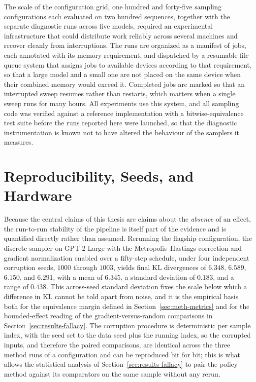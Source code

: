 The scale of the configuration grid, one hundred and forty-five sampling configurations each evaluated on two hundred sequences, together with the separate diagnostic runs across five models, required an experimental infrastructure that could distribute work reliably across several machines and recover cleanly from interruptions. The runs are organized as a manifest of jobs, each annotated with its memory requirement, and dispatched by a resumable file-queue system that assigns jobs to available devices according to that requirement, so that a large model and a small one are not placed on the same device when their combined memory would exceed it. Completed jobs are marked so that an interrupted sweep resumes rather than restarts, which matters when a single sweep runs for many hours. All experiments use this system, and all sampling code was verified against a reference implementation with a bitwise-equivalence test suite before the runs reported here were launched, so that the diagnostic instrumentation is known not to have altered the behaviour of the samplers it measures.

\section{Reproducibility, Seeds, and Hardware}
\label{sec:meth-repro}

Because the central claims of this thesis are claims about the \emph{absence} of an effect, the run-to-run stability of the pipeline is itself part of the evidence and is quantified directly rather than assumed. Rerunning the flagship configuration, the discrete sampler on GPT-2 Large with the Metropolis--Hastings correction and gradient normalization enabled over a fifty-step schedule, under four independent corruption seeds, $1000$ through $1003$, yields final KL divergences of $6.348$, $6.589$, $6.150$, and $6.291$, with a mean of $6.345$, a standard deviation of $0.183$, and a range of $0.438$.
This across-seed standard deviation fixes the scale below which a difference in KL cannot be told apart from noise, and it is the empirical basis both for the equivalence margin defined in Section~\ref{sec:meth-metrics} and for the bounded-effect reading of the gradient-versus-random comparisons in Section~\ref{sec:results-fallacy}. The corruption procedure is deterministic per sample index, with the seed set to the data seed plus the running index, so the corrupted inputs, and therefore the paired comparisons, are identical across the three method runs of a configuration and can be reproduced bit for bit; this is what allows the statistical analysis of Section~\ref{sec:results-fallacy} to pair the policy method against its comparators on the same sample without any rerun.


